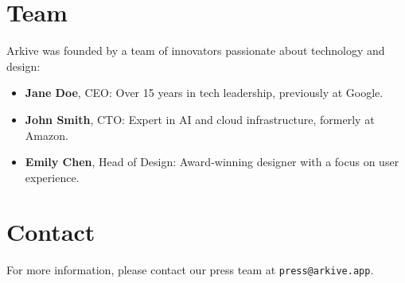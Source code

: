 \documentclass[11pt, a4paper]{article}
\begin{document}
\section{Team}
Arkive was founded by a team of innovators passionate about technology and design:
\begin{itemize}
    \item \textbf{Jane Doe}, CEO: Over 15 years in tech leadership, previously at Google.
    \item \textbf{John Smith}, CTO: Expert in AI and cloud infrastructure, formerly at Amazon.
    \item \textbf{Emily Chen}, Head of Design: Award-winning designer with a focus on user experience.
\end{itemize}

\section{Contact}
For more information, please contact our press team at \texttt{press@arkive.app}.
\end{document}
